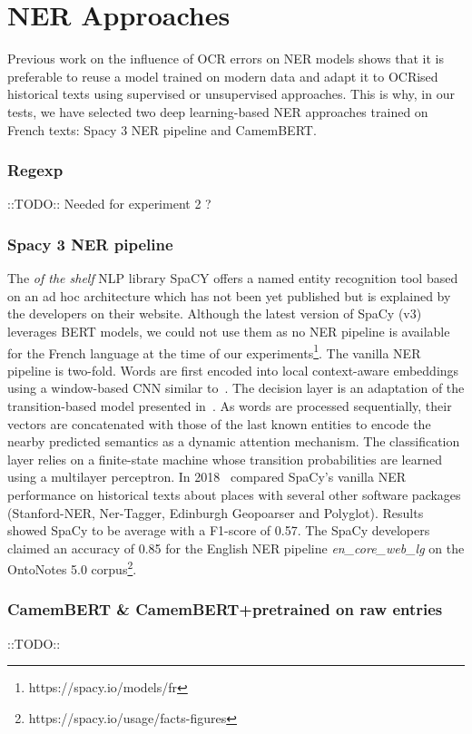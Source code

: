 \section{NER Approaches}

Previous work on the influence of OCR errors on NER models shows that it is preferable to reuse a model trained on modern data and adapt it to OCRised historical texts using supervised or unsupervised approaches. This is why, in our tests, we have selected two deep learning-based NER approaches trained on French texts: Spacy 3 NER pipeline and CamemBERT. 

\subsubsection{Regexp}
::TODO::
Needed for experiment 2 ?

\subsubsection{Spacy 3 NER pipeline}
The \textit{of the shelf} NLP library SpaCY offers a named entity recognition tool based on an ad hoc architecture which has not been yet published but is explained by the developers on their website. Although the latest version of SpaCy (v3) leverages BERT models, we could not use them as no NER pipeline is available for the French language at the time of our experiments\footnote{https://spacy.io/models/fr}.
The vanilla NER pipeline is two-fold. Words are first encoded into local context-aware embeddings using a window-based CNN similar to~\cite{collobert2011}.
The decision layer is an adaptation of the transition-based model presented in~\cite{lample2016}.
As words are processed sequentially, their vectors are concatenated with those of the last known entities to encode the nearby predicted semantics as a dynamic attention mechanism.
The classification layer relies on a finite-state machine whose transition probabilities are learned using a multilayer perceptron.
In 2018~\cite{won2018} compared SpaCy's vanilla NER performance on historical texts about places with several other software packages (Stanford-NER, Ner-Tagger, Edinburgh Geopoarser and Polyglot). Results showed SpaCy to be average with a F1-score of 0.57.
The SpaCy developers claimed an accuracy of 0.85 for the English NER pipeline \textit{en\_core\_web\_lg} on the OntoNotes 5.0 corpus\footnote{https://spacy.io/usage/facts-figures}.

\subsubsection{CamemBERT \& CamemBERT+pretrained on raw entries}
::TODO::


